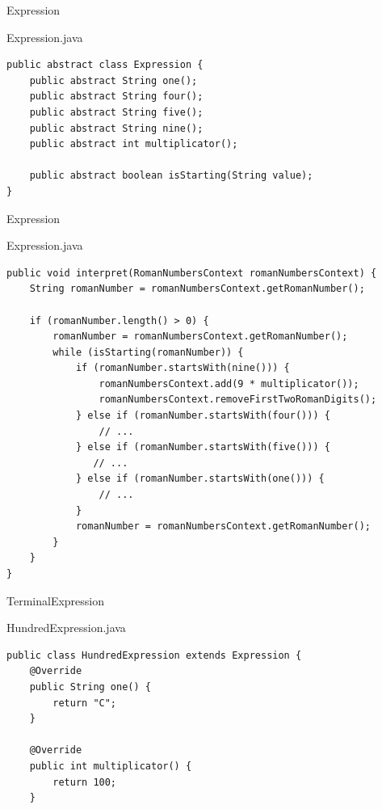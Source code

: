 \begin{frame}[fragile]{Expression}
	\begin{exampleblock}{Expression.java}
 		\begin{lstlisting}
public abstract class Expression {
	public abstract String one();
	public abstract String four();
	public abstract String five();
	public abstract String nine();
	public abstract int multiplicator();

	public abstract boolean isStarting(String value);
}

 		\end{lstlisting}
 	\end{exampleblock}
\end{frame}

\begin{frame}[fragile]{Expression}
	\begin{exampleblock}{Expression.java}
 		\begin{lstlisting}
public void interpret(RomanNumbersContext romanNumbersContext) {
    String romanNumber = romanNumbersContext.getRomanNumber();
    
    if (romanNumber.length() > 0) {
        romanNumber = romanNumbersContext.getRomanNumber();
        while (isStarting(romanNumber)) {
            if (romanNumber.startsWith(nine())) {
                romanNumbersContext.add(9 * multiplicator());
                romanNumbersContext.removeFirstTwoRomanDigits();
            } else if (romanNumber.startsWith(four())) {
                // ...
            } else if (romanNumber.startsWith(five())) {
               // ...
            } else if (romanNumber.startsWith(one())) {
                // ...
            }
            romanNumber = romanNumbersContext.getRomanNumber();
        }
    }
}
 		\end{lstlisting}
 	\end{exampleblock}
\end{frame}

\begin{frame}[fragile]{TerminalExpression}
	\begin{exampleblock}{HundredExpression.java}
 		\begin{lstlisting}
public class HundredExpression extends Expression {
	@Override
	public String one() {
		return "C";
	}

	@Override
	public int multiplicator() {
		return 100;
	}
 		\end{lstlisting}
 	\end{exampleblock}
\end{frame}

